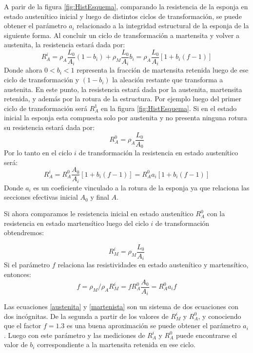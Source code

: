 \documentclass[a4paper,12pt,fleqn,twoside,openany]{book}
\begin{document}
 A parir de la figura \ref{fig:HistEsquema}, comparando la resistencia de la esponja en estado austenítico inicial y luego de distintos ciclos de transformación, se puede obtener el parámetro $a_i$ relacionado a la integridad estructural de la esponja de la siguiente forma. Al concluir un ciclo de transformación a martensita y volver a austenita, la resistencia estará dada por:
\begin{equation}
 R_A^{i}=\rho_A \frac{L_0}{A_i}(1-b_i) + \rho_M \frac{L_0}{A_i}b_i = \rho_A \frac{L_0}{A_i} [1+ b_i (f-1)]
\end{equation}
Donde ahora $0<b_i <1$ representa la fracción de martensita retenida luego de ese ciclo de transformación y $(1-b_ i)$ la aleación restante que transforma a austenita. En este punto, la resistencia estará dada por la austenita, martensita retenida, y además por la rotura de la estructura. Por ejemplo luego del primer ciclo de transformación será $R_A ^{1}$ en la figura \ref{fig:HistEsquema}. 
Si en el estado inicial la esponja esta compuesta solo por austenita y no presenta ninguna rotura su resistencia estará dada por:
\begin{equation}
 R_A ^0 = \rho_A \frac{L_0}{A_0}
\end{equation}
Por lo tanto en el ciclo $i$ de transformación la resistencia en estado austenítico será:
\begin{equation}
 R_A ^i = R_A ^0 \frac{A_0}{A_i} [1+b_i (f-1)]=R_A ^0 a_i [1+b_i (f-1)] \label{austenita}
\end{equation}
Donde $a_i$ es un coeficiente vinculado a la rotura de la esponja ya que relaciona las secciones efectivas inicial $A_0$ y final $A$.

Si ahora comparamos le resistencia inicial en estado austenítico $R_A ^0$ con la resistencia en estado martensítico luego del ciclo $i$ de transformación obtendremos:

\begin{equation}
 R_M ^i = \rho _M \frac{L_0}{A_i}
\end{equation}
Si el parámetro $f$ relaciona las resistividades en estado austenítico y martensítico, entonces:
\begin{equation}
 f=\rho_M / \rho_A
 R_M ^i = f R_A ^0 \frac{A_0}{A_i} = R_A ^0 a_i f \label{martensita}
\end{equation}

Las ecuaciones \ref{austenita} y \ref{martenista} son un sistema de dos ecuaciones con dos incógnitas. De la segunda a partir de los valores de $R_M ^i$ y $R_A ^0$, y conociendo que el factor $f = 1.3$ es una buena aproximación se puede obtener el parámetro $a_i$. Luego con este parámetro y las mediciones de $R_A ^i$ y $R_A ^0$ puede encontrarse el valor de $b_i$ correspondiente a la martensita retenida en ese ciclo.  
\end{document}
